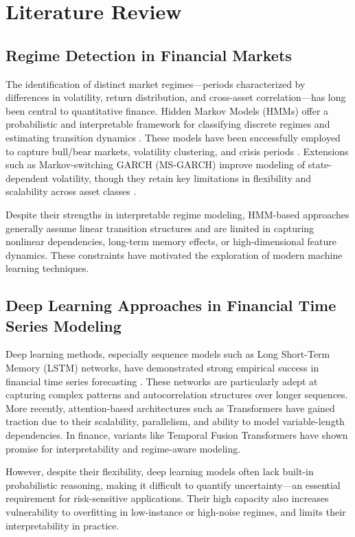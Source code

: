 \section{Literature Review}

\subsection{Regime Detection in Financial Markets}
The identification of distinct market regimes—periods characterized by differences in volatility, return distribution, and cross-asset correlation—has long been central to quantitative finance. Hidden Markov Models (HMMs) offer a probabilistic and interpretable framework for classifying discrete regimes and estimating transition dynamics \cite{hamilton1989new}. These models have been successfully employed to capture bull/bear markets, volatility clustering, and crisis periods \cite{ang2002international}. Extensions such as Markov-switching GARCH (MS-GARCH) improve modeling of state-dependent volatility, though they retain key limitations in flexibility and scalability across asset classes \cite{klaassen2002improving}.

Despite their strengths in interpretable regime modeling, HMM-based approaches generally assume linear transition structures and are limited in capturing nonlinear dependencies, long-term memory effects, or high-dimensional feature dynamics. These constraints have motivated the exploration of modern machine learning techniques.

\subsection{Deep Learning Approaches in Financial Time Series Modeling}
Deep learning methods, especially sequence models such as Long Short-Term Memory (LSTM) networks, have demonstrated strong empirical success in financial time series forecasting \cite{fischer2018deep, nelson2017stock}. These networks are particularly adept at capturing complex patterns and autocorrelation structures over longer sequences. More recently, attention-based architectures such as Transformers \cite{vaswani2017attention} have gained traction due to their scalability, parallelism, and ability to model variable-length dependencies. In finance, variants like Temporal Fusion Transformers \cite{lim2021temporal} have shown promise for interpretability and regime-aware modeling.

However, despite their flexibility, deep learning models often lack built-in probabilistic reasoning, making it difficult to quantify uncertainty—an essential requirement for risk-sensitive applications. Their high capacity also increases vulnerability to overfitting in low-instance or high-noise regimes, and limits their interpretability in practice.


